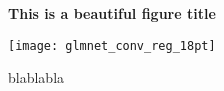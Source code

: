 \begin{figure}[htp]
    \centering
    \textbf{This is a beautiful figure title}\par\medskip
    \texttt{[image: glmnet\_conv\_reg\_18pt]}
\caption{blablabla}
\label{fig:glmnet_conv_reg}
\end{figure}
